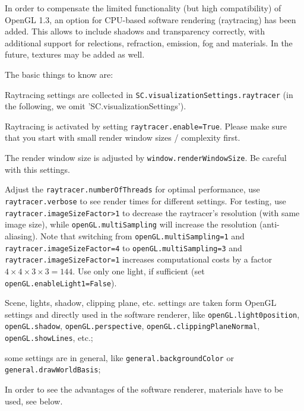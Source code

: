 In order to compensate the limited functionality (but high compatibility) of OpenGL 1.3, an option for CPU-based software rendering (raytracing) has been added.
This allows to include shadows and transparency correctly, with additional support for relections, refraction, emission, fog and materials.
In the future, textures may be added as well.


The basic things to know are:
\bi
  \item Raytracing settings are collected in \texttt{SC.visualizationSettings.raytracer} (in the following, we omit 'SC.visualizationSettings').
  \item Raytracing is activated by setting \texttt{raytracer.enable=True}. Please make sure that you start with small render window sizes / complexity first.
  \item The render window size is adjusted by \texttt{window.renderWindowSize}. Be careful with this settings.
  \item Adjust the \texttt{raytracer.numberOfThreads} for optimal performance, use \texttt{raytracer.verbose} to see render times for different settings. For testing, use \texttt{raytracer.imageSizeFactor>1} to decrease the raytracer's resolution (with same image size), while \texttt{openGL.multiSampling} will increase the resolution (anti-aliasing). Note that switching from \texttt{openGL.multiSampling=1} and \texttt{raytracer.imageSizeFactor=4} to \texttt{openGL.multiSampling=3} and \texttt{raytracer.imageSizeFactor=1} increases computational costs by a factor $4\times 4\times 3\times 3 = 144$. Use only one light, if sufficient (set \texttt{openGL.enableLight1=False}).
  \item Scene, lights, shadow, clipping plane, etc. settings are taken form OpenGL settings and directly used in the software renderer, like \texttt{openGL.light0position}, \texttt{openGL.shadow}, \texttt{openGL.perspective}, \texttt{openGL.clippingPlaneNormal}, \texttt{openGL.showLines}, etc.; 
  \item some settings are in general, like \texttt{general.backgroundColor} or \texttt{general.drawWorldBasis};
  \item In order to see the advantages of the software renderer, materials have to be used, see below.
\ei


